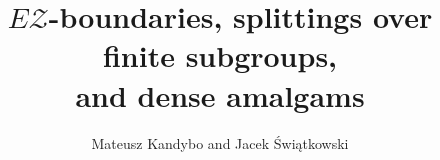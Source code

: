 \documentclass[12pt, a4paper]{article}
\title{$E\mathcal{Z}$-boundaries, splittings over finite subgroups, \\and dense amalgams}
\author{Mateusz Kandybo and Jacek Świątkowski}
\newcommand{\8}{\infty}
\newcommand{\abs}[1]{\left| #1 \right|}
\theoremstyle{break}
\theoremstyle{defbreak}
\newcommand{\ol}[1]{\overline{#1}}
\newcommand{\com}[1]{}
\begin{document}

\maketitle

\com{\section{Dictionary}

$a$\\
$b$\\
$c$ - path\\
$d, d_\square$ - metrics\\
$e$ - element of $E$ (or $\ol{E}$)\\
$f$ -function in $P$-separation lemma \\
$g$ - element of $G_{\square}$\\
$h$\\
$i$ - natural number; $i_y$ - monomorphism from the definition of the graph of groups\\
$j$\\
$k$\\
$l$ - length of a path\\
$m$ - natural number; element of $M$\\
$n$ - natural number\\
$o$\\
$p$\\
$q$\\
$r$\\
$s$ - generator of $\Gamma$; $s_y$ - generator corresponding to an edge $y$ in $\pi_1(\mathcal{G},Y,T)$\\
$t$\\
$u$\\
$v$ - vertex from $Y$\\
$w$\\
$x$\\
$y$ - oriented edge from $Y$; $\ol{y}$ - edge oppositely oriented to $y$; $\abs{y}$ - non-oriented edge corresponding to $y$\\
$z$ - element of $Z$

}
\end{document}

